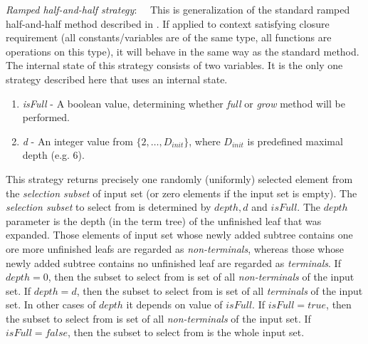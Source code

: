 \documentclass[conference]{IEEEtran}
\newcommand{\setDots}[2]{ \lbrace #1 , \dots , #2 \rbrace}
\begin{document}
\textit{Ramped half-and-half strategy}:~~
This is generalization of the standard ramped half-and-half method described 
in \cite{koza92}. If applied to context satisfying closure requirement
(all constants/variables are of the same type, all functions are operations
on this type), it will behave in the same way as the standard method.
The internal state of this strategy consists of two variables.
It is the only one strategy described here that uses an internal state.

\begin{enumerate}
 \item \textit{isFull} - A boolean value, determining whether \textit{full}
                     or \textit{grow} method will be performed.
 \item \textit{d} - An integer value from $\setDots{2}{D_{init}}$, where 
                $D_{init}$ is predefined maximal depth (e.g. 6).                    
\end{enumerate}

This strategy returns precisely one randomly
(uniformly) selected  element from 
the \textit{selection subset} of input set
(or zero elements if the input set is empty). 
The \textit{selection subset} 
to select from is determined by $depth, d$ and $isFull$.
The $depth$ parameter is the depth (in the term tree) 
of the unfinished leaf that was expanded.
Those elements of input set whose newly added subtree contains one ore more 
unfinished leafs are regarded as \textit{non-terminals}, whereas 
those whose newly added subtree contains no unfinished leaf are regarded as 
\textit{terminals}.
If $depth = 0$, then the subset to select from is  
set of all \textit{non-terminals} of the input set.
If $depth = d$, then the subset to select from is
set of all \textit{terminals} of the input set.
In other cases of $depth$ it depends on value of $isFull$.
If $isFull = true$, then the subset to select from is 
set of all \textit{non-terminals} of the input set.
If $isFull = false$, then the subset to select from is 
the whole input set.\\
\end{document}
